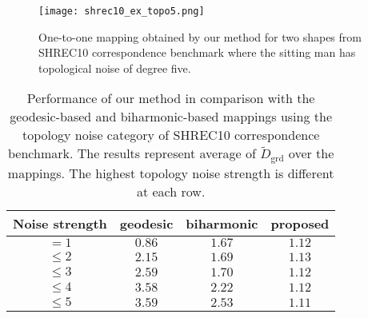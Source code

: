 \begin{figure}[t]
  \centering
  \texttt{[image: shrec10\_ex\_topo5.png]}
  \caption{\label{fig:shrec10ex}
  One-to-one mapping obtained by our method for two shapes from SHREC10 correspondence benchmark where the sitting man has topological noise of degree five.
  }
\end{figure}
\begin{table}[t]
\centering
\begin{tabular}{|c|c|c|c|}
 \hline
 Noise strength & geodesic & biharmonic & proposed \\
 \hline
 $= 1$ & $\mathbf{0.86}$ & $1.67$ & $1.12$ \\
 \hline
 $\le 2$ & $2.15$ & $1.69$ & $\mathbf{1.13}$\\
 \hline
 $\le 3$ & $2.59$ & $1.70$ & $\mathbf{1.12}$\\
 \hline
 $\le 4$ & $3.58$ & $2.22$ & $\mathbf{1.12}$\\
 \hline
 $\le 5$ & $3.59$ & $2.53$ & $\mathbf{1.11}$\\
 \hline
\end{tabular}
\caption{\label{table:shrec10res}
Performance of our method in comparison with the geodesic-based and biharmonic-based mappings using the topology noise category of SHREC10 correspondence benchmark. The results represent average of ${\widetilde{D}_{\mathrm{grd}}}$ over the mappings. The highest topology noise strength is different at each row.
}
\end{table}

